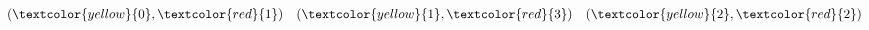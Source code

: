 \documentclass[preview]{standalone}
\begin{document}
\begin{align*}
(\textcolor{yellow}{0}, \textcolor{red}{1}) \quad(\textcolor{yellow}{1}, \textcolor{red}{3}) \quad(\textcolor{yellow}{2}, \textcolor{red}{2})
\end{align*}
\end{document}
